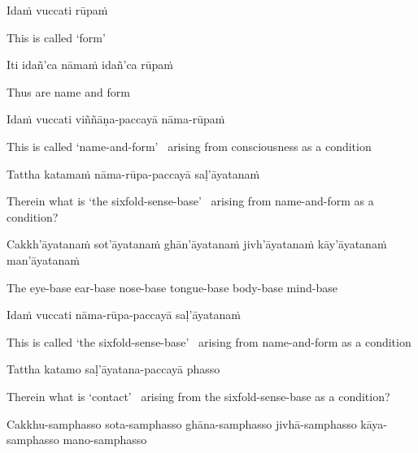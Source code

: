 Idaṁ vuccati rūpaṁ

\begin{english}
  This is called `form'
\end{english}

Iti idañ'ca nāmaṁ idañ'ca rūpaṁ

\begin{english}
  Thus are name and form
\end{english}

Idaṁ vuccati viññāṇa-paccayā nāma-rūpaṁ

\begin{english-hang}
  This is called `name-and-form' \breathmark\ arising from consciousness as a condition
\end{english-hang}

Tattha katamaṁ nāma-rūpa-paccayā saḷ'āyatanaṁ

\begin{english-hang}
  Therein what is `the sixfold-sense-base' \breathmark\ arising from name-and-form as a condition?
\end{english-hang}


\begin{pali-hang}
  Cakkh'āyatanaṁ sot'āyatanaṁ ghān'āyatanaṁ jivh'āyatanaṁ kāy'āyatanaṁ man'āyatanaṁ
\end{pali-hang}

\begin{english-hang}
  The eye-base ear-base nose-base tongue-base body-base mind-base
\end{english-hang}

Idaṁ vuccati nāma-rūpa-paccayā saḷ'āyatanaṁ

\begin{english-hang}
  This is called `the sixfold-sense-base' \breathmark\ arising from name-and-form as a condition
\end{english-hang}

Tattha katamo saḷ'āyatana-paccayā phasso

\begin{english-hang}
  Therein what is `contact' \breathmark\ arising from the sixfold-sense-base as a condition?
\end{english-hang}

\begin{pali-hang}
  Cakkhu-samphasso sota-samphasso ghāna-samphasso jivhā-samphasso kāya-samphasso mano-samphasso
\end{pali-hang}

